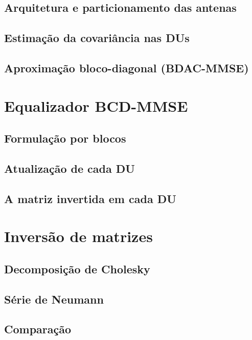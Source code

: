 \subsection{Arquitetura e particionamento das antenas}
\subsection{Estimação da covariância nas DUs}
\subsection{Aproximação bloco-diagonal (BDAC-MMSE)}

\section{Equalizador BCD-MMSE}\label{sec:bcd}

\subsection{Formulação por blocos}
\subsection{Atualização de cada DU}
\subsection{A matriz invertida em cada DU}\label{subsec:Gc}

\section{Inversão de matrizes}\label{sec:inversao}

\subsection{Decomposição de Cholesky}
\subsection{Série de Neumann}
\subsection{Comparação}
